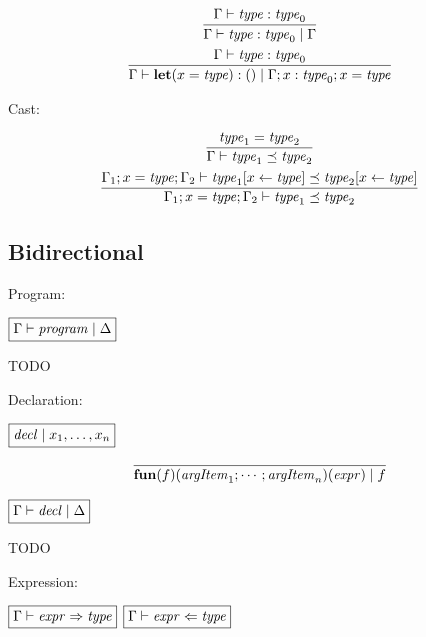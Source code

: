 \begin{gather*}
  \infer{\Gamma \vdash \mathit{type}: \mathit{type}_0 \mid \Gamma}{
    \Gamma \vdash \mathit{type}: \mathit{type}_0
  }
  \\
  \infer{\Gamma \vdash \mathbf{let}(x = \mathit{type}): () \mid \Gamma; x: \mathit{type}_0; x = \mathit{type}}{
    \Gamma \vdash \mathit{type}: \mathit{type}_0
  }
\end{gather*}

Cast:

\begin{gather*}
  \infer{\Gamma \vdash \mathit{type}_1 \preceq \mathit{type}_2}{
    \mathit{type}_1 = \mathit{type}_2
  }
  \\
  \infer{\Gamma_1; x = \mathit{type}; \Gamma_2 \vdash \mathit{type}_1 \preceq \mathit{type}_2}{
    \Gamma_1; x = \mathit{type}; \Gamma_2 \vdash \mathit{type}_1[x \assign \mathit{type}] \preceq \mathit{type}_2[x \assign \mathit{type}]
  }
\end{gather*}

\subsection{Bidirectional}

Program:

$\fbox{$\Gamma \vdash \mathit{program} \mid \Delta$}$

TODO

Declaration:

$\fbox{$\mathit{decl} \mid x_1, \ldots, x_n$}$

\begin{gather*}
  \infer{\mathbf{fun}(f)(\mathit{argItem}_1; \cdots; \mathit{argItem}_n)(\mathit{expr}) \mid f}{}
\end{gather*}

$\fbox{$\Gamma \vdash \mathit{decl} \mid \Delta$}$

TODO

Expression:

$\fbox{$\Gamma \vdash \mathit{expr} \Rightarrow \mathit{type}$}$
$\fbox{$\Gamma \vdash \mathit{expr} \Leftarrow \mathit{type}$}$

